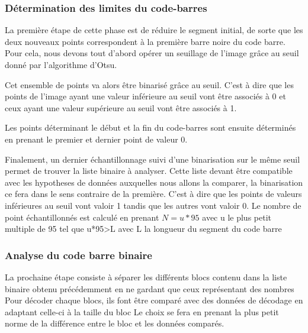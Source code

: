 \documentclass{rapport}
\begin{document}
\subsubsection*{Détermination des limites du code-barres}
La première étape de cette phase est de réduire le segment initial, de sorte que les deux nouveaux points correspondent à la première barre noire du code barre.
Pour cela, nous devons tout d'abord opérer un seuillage de l'image grâce au seuil donné par l'algorithme d'Otsu.

Cet ensemble de points va alors être binarisé grâce au seuil. C'est à dire que les points de l'image ayant une valeur inférieure au seuil vont être associés à 0 et ceux ayant une valeur supérieure au seuil vont être associés à 1.

Les points déterminant le début et la fin du code-barres sont ensuite déterminés en prenant le premier et dernier point de valeur 0.

Finalement, un dernier échantillonnage suivi d'une binarisation sur le même seuil permet de trouver la liste binaire à analyser. Cette liste devant être compatible avec les hypotheses de données auxquelles nous allons la comparer, la binarisation ce fera dans le sens contraire de la première.
C'est à dire que les points de valeurs inférieures au seuil vont valoir 1 tandis que les autres vont valoir 0.
Le nombre de point échantillonnés est calculé en prenant $N=u*95$ avec u le plus petit multiple de 95 tel que u*95>L avec L la longueur du segment du code barre

\subsubsection{Analyse du code barre binaire}
La prochaine étape consiste à séparer les différents blocs contenu dans la liste binaire obtenu précédemment en ne gardant que ceux représentant des nombres
Pour décoder chaque blocs, ils font être comparé avec des données de décodage en adaptant celle-ci à la taille du bloc 
Le choix se fera en prenant la plus petit norme de la différence entre le bloc et les données comparés.
\end{document}
